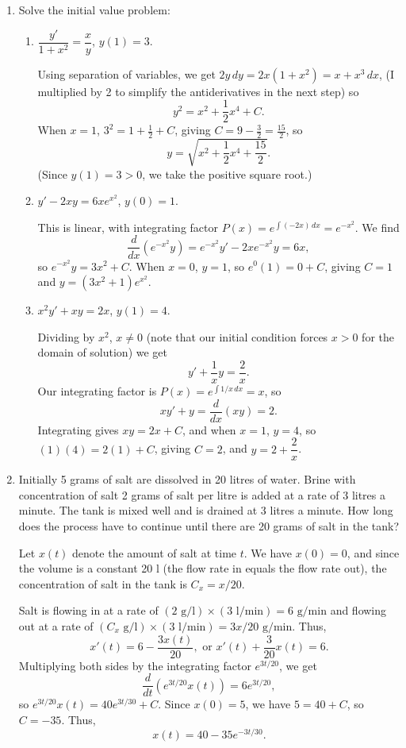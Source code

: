 \documentclass[12pt]{article}
\begin{document}
 \begin{enumerate}
\item Solve the initial value problem:
\begin{enumerate}
\item $\dfrac{y'}{1+x^2}=\dfrac{x}{y}$, $y(1)=3$.

Using separation of variables, we get $2y\,dy = 2x(1+x^2)=x+x^3\,dx$, (I multiplied by 2 to simplify the antiderivatives in the next step) so
\[
y^2 = x^2+\frac12 x^4+C.
\]
When $x=1$, $3^2 = 1 +\frac12 +C$, giving $C= 9-\frac32=\frac{15}{2}$, so
\[
y = \sqrt{x^2+\frac12 x^4+\frac{15}{2}}.
\]
(Since $y(1)=3>0$, we take the positive square root.)


\item $y'-2xy = 6xe^{x^2}$, $y(0)=1$.

This is linear, with integrating factor $P(x) = e^{\int(-2x)\,dx} = e^{-x^2}$. We find
\[
\frac{d}{dx}(e^{-x^2}y) = e^{-x^2}y' -2xe^{-x^2}y = 6x,
\]
so $e^{-x^2}y=3x^2+C$. When $x=0$, $y=1$, so $e^{0}(1)=0+C$, giving $C=1$ and $y=(3x^2+1)e^{x^2}$.

\item $x^2y'+xy=2x$, $y(1)=4$.

Dividing by $x^2$, $x\neq 0$ (note that our initial condition forces $x>0$ for the domain of solution) we get
\[
y' + \frac1x y = \frac2x.
\]
Our integrating factor is $P(x) = e^{\int 1/x\,dx} = x$, so 
\[
xy'+y = \frac{d}{dx}(xy) = 2.
\]
Integrating gives $xy = 2x+C$, and when $x=1$, $y=4$, so $(1)(4)=2(1)+C$, giving $C=2$, and $y=2+\dfrac{2}{x}$.
\end{enumerate}
 \newpage
 
\item Initially 5 grams of salt are dissolved in 20 litres of water.
Brine with concentration of salt 2 grams of salt per litre is
added at a rate of 3 litres a minute. The tank is mixed well
and is drained at 3 litres a minute. How long does the process have to continue until there are 20 grams of salt in the
tank?

\bigskip

Let $x(t)$ denote the amount of salt at time $t$. We have $x(0)=0$, and since the volume is a constant 20 l (the flow rate in equals the flow rate out), the concentration of salt in the tank is $C_x = x/20$. 

Salt is flowing in at a rate of $(2\text{ g/l})\times (3\text{ l/min})=6\text{ g/min}$ and flowing out at a rate of $(C_x\text{ g/l})\times (3\text{ l/min}) = 3x/20\text{ g/min}$. Thus,
\[
x'(t) = 6-\frac{3x(t)}{20}, \text{ or } x'(t)+\frac{3}{20}x(t)=6.
\]
Multiplying both sides by the integrating factor $e^{3t/20}$, we get
\[
\frac{d}{dt}(e^{3t/20}x(t))=6e^{3t/20},
\]
so $e^{3t/20}x(t) = 40e^{3t/30}+C$. Since $x(0)=5$, we have $5=40+C$, so $C=-35$. Thus,
\[
x(t) = 40-35e^{-3t/30}.
\]


\end{enumerate}
\end{document}
